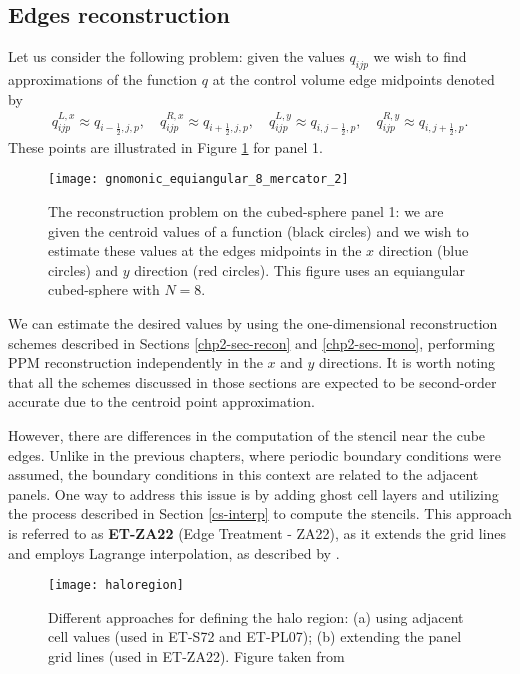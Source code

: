 \subsection{Edges reconstruction}
\label{cs-recon}
Let us consider the following problem: given the values $q_{ijp}$ we wish to find 
approximations of the function $q$ at the control volume edge midpoints denoted by
\begin{align*}
q^{L,x}_{ijp}  \approx q_{{i-\frac{1}{2}},j,p},\quad
q^{R,x}_{ijp}  \approx q_{{i+\frac{1}{2}},j,p},\quad
q^{L,y}_{ijp}  \approx q_{i,{j-\frac{1}{2}},p},\quad
q^{R,y}_{ijp}  \approx q_{i,{j+\frac{1}{2}},p}.
\end{align*}
These points are illustrated in Figure \ref{csgrid-rpoints} for panel 1.
\begin{figure}[!htb]
	\centering
	\texttt{[image: gnomonic\_equiangular\_8\_mercator\_2]}
	\caption{The reconstruction problem on the cubed-sphere panel 1: we are given the centroid values of a function (black circles)
		and we wish to estimate these values at the edges midpoints in the $x$ direction (blue circles) and $y$ direction (red circles).
		This figure uses an equiangular cubed-sphere with $N=8$.} \label{csgrid-rpoints}
\end{figure}

We can estimate the desired values by using the one-dimensional reconstruction schemes 
described in Sections \ref{chp2-sec-recon} and \ref{chp2-sec-mono}, 
performing PPM reconstruction independently in the $x$ and $y$ directions. 
It is worth noting that all the schemes discussed in those sections are 
expected to be second-order accurate due to the centroid point approximation.

However, there are differences in the computation of the stencil near the cube edges. 
Unlike in the previous chapters, where periodic boundary conditions were assumed, 
the boundary conditions in this context are related to the adjacent panels. 
One way to address this issue is by adding ghost cell layers and utilizing 
the process described in Section \ref{cs-interp} to compute the stencils. 
This approach is referred to as \textbf{ET-ZA22} (Edge Treatment - ZA22), 
as it extends the grid lines and employs Lagrange interpolation, 
as described by \citet{zerroukat:2022}.
\begin{figure}[!htb]
	\centering
	\texttt{[image: haloregion]}
	\caption{Different approaches for defining the halo region:
    (a) using adjacent cell values (used in ET-S72 and ET-PL07);
    (b) extending the panel grid lines (used in ET-ZA22). 
    Figure taken from \citet{ross:2006} \label{chp4-haloregion}}
\end{figure}

